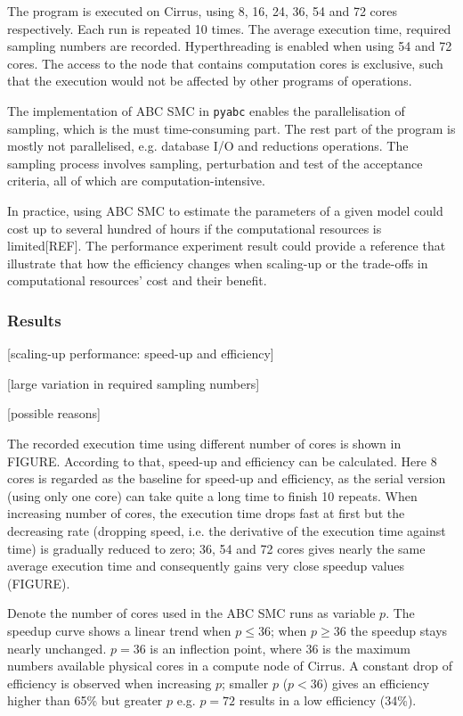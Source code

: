 \documentclass[12pt,a4paper]{report}
\begin{document}
The program is executed on Cirrus, using 8, 16, 24, 36, 54 and 72 cores respectively. Each run is repeated 10 times. The average execution time, required sampling numbers are recorded. Hyperthreading is enabled when using 54 and 72 cores. The access to the node that contains computation cores is exclusive, such that the execution would not be affected by other programs of operations.

The implementation of ABC SMC in \verb|pyabc| enables the parallelisation of sampling, which is the must time-consuming part. The rest part of the program is mostly not parallelised, e.g. database I/O and reductions operations. The sampling process involves sampling, perturbation and test of the acceptance criteria, all of which are computation-intensive.

In practice, using ABC SMC to estimate the parameters of a given model could cost up to several hundred of hours if the computational resources is limited[REF]. The performance experiment result could provide a reference that illustrate that how the efficiency changes when scaling-up or the trade-offs in computational resources' cost and their benefit.

\subsubsection{Results}

[scaling-up performance: speed-up and efficiency]

[large variation in required sampling numbers]

[possible reasons]

The recorded execution time using different number of cores is shown in FIGURE. According to that, speed-up and efficiency can be calculated. Here 8 cores is regarded as the baseline for speed-up and efficiency, as the serial version (using only one core) can take quite a long time to finish 10 repeats. When increasing number of cores, the execution time drops fast at first but the decreasing rate (dropping speed, i.e. the derivative of the execution time against time) is gradually reduced to zero; 36, 54 and 72 cores gives nearly the same average execution time and consequently gains very close speedup values (FIGURE).

Denote the number of cores used in the ABC SMC runs as variable $p$. The speedup curve shows a linear trend when $p\leq 36$; when $p\geq 36$ the speedup stays nearly unchanged. $p=36$ is an inflection point, where 36 is the maximum numbers available physical cores in a compute node of Cirrus. A constant drop of efficiency is observed when increasing $p$; smaller $p$ ($p<36$) gives an efficiency higher than 65\% but greater $p$ e.g. $p=72$ results in a low efficiency (34\%).
\end{document}
